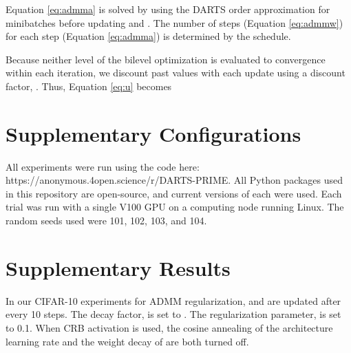\documentclass[letterpaper]{article} \usepackage{aaai22}  \usepackage{times}  \usepackage{helvet}  \usepackage{courier}  \usepackage[hyphens]{url}  \usepackage{graphicx} \urlstyle{rm} \def\UrlFont{\rm}  \usepackage{natbib}  \usepackage{caption} \DeclareCaptionStyle{ruled}{labelfont=normalfont,labelsep=colon,strut=off} \frenchspacing  \setlength{\pdfpagewidth}{8.5in}  \setlength{\pdfpageheight}{11in}  \usepackage{algorithm}
\begin{document}
Equation \ref{eq:admma} is solved by using the DARTS  order approximation for  minibatches before updating  and . The number of  steps (Equation \ref{eq:admmw}) for each  step (Equation \ref{eq:admma}) is determined by the  schedule.

Because neither level of the bilevel optimization is evaluated to convergence within each iteration, we discount past  values with each update using a discount factor, . Thus, Equation \ref{eq:u} becomes


\section{Supplementary Configurations} \label{sec:suppconfig}

All experiments were run using the code here: https://anonymous.4open.science/r/DARTS-PRIME. All Python packages used in this repository are open-source, and current versions of each were used. Each trial was run with a single V100 GPU on a computing node running Linux. The random seeds used were 101, 102, 103, and 104.

\section{Supplementary Results} \label{sec:suppresults}
In our CIFAR-10 experiments for ADMM regularization,  and  are updated after every 10  steps. The decay factor,  is set to . The regularization parameter,  is set to 0.1. When CRB activation is used, the cosine annealing of the architecture learning rate and the weight decay of  are both turned off.
\end{document}
